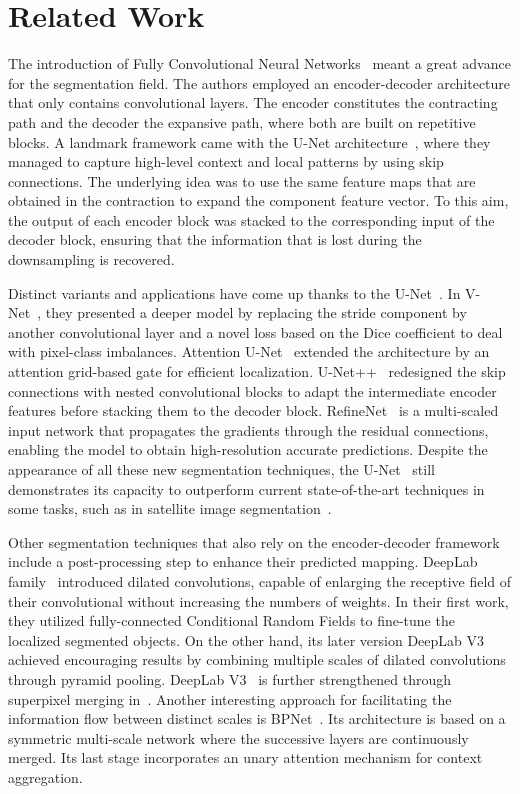 \section{Related Work}

The introduction of Fully Convolutional Neural Networks~\cite{fcn} meant a great advance for the segmentation field. The authors employed an encoder-decoder architecture that only contains convolutional layers. The encoder constitutes the contracting path and the decoder the expansive path, where both are built on repetitive blocks. A landmark framework came with the U-Net architecture~\cite{unet}, where they managed to capture high-level context and local patterns by using skip connections. The underlying idea was to use the same feature maps that are obtained in the contraction to expand the component feature vector. To this aim, the output of each encoder block was stacked to the corresponding input of the decoder block, ensuring that the information that is lost during the downsampling is recovered. 

Distinct variants and applications have come up thanks to the U-Net~\cite{unet}. In V-Net~\cite{vnet}, they presented a deeper model by replacing the stride component by another convolutional layer and a novel loss based on the Dice coefficient to deal with pixel-class imbalances. Attention U-Net~\cite{attentionunet} extended the architecture by an attention grid-based gate for efficient localization. U-Net++~\cite{unet++} redesigned the skip connections with nested convolutional blocks to adapt the intermediate encoder features before stacking them to the decoder block. RefineNet~\cite{refinenet} is a multi-scaled input network that propagates the gradients through the residual connections, enabling the model to obtain high-resolution accurate predictions. Despite the appearance of all these new segmentation techniques, the U-Net~\cite{unet} still demonstrates its capacity to outperform current state-of-the-art techniques in some tasks, such as in satellite image segmentation~\cite{satellite}.


Other segmentation techniques that also rely on the encoder-decoder framework include a post-processing step to enhance their predicted mapping. DeepLab family~\cite{deeplab} introduced dilated convolutions, capable of enlarging the receptive field of their convolutional without increasing the numbers of weights. In their first work, they utilized fully-connected Conditional Random Fields to fine-tune the localized segmented objects. On the other hand, its later version DeepLab V3~\cite{deeplabv3} achieved encouraging results by combining multiple scales of dilated convolutions through pyramid pooling. DeepLab V3~\cite{deeplabv3} is further strengthened through superpixel merging in~\cite{generic}. Another interesting approach for facilitating the information flow between distinct scales is BPNet~\cite{realtime}. Its architecture is based on a symmetric multi-scale network where the successive layers are continuously merged. Its last stage incorporates an unary attention mechanism for context aggregation. 


